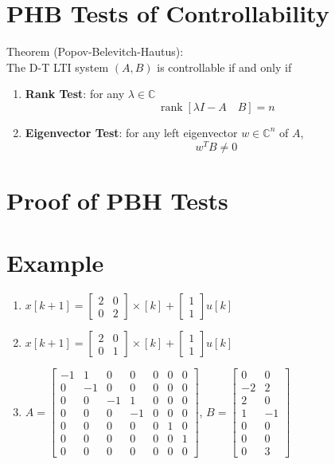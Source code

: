 \documentclass[10pt,a4paper,oneside]{article}
\begin{document}
\section{PHB Tests of Controllability}
Theorem (Popov-Belevitch-Hautus):\\
The D-T LTI system $(A, B)$ is controllable if and only if
\begin{enumerate}
\item {\bfseries Rank Test}: for any $\lambda\in\mathbb{C}$
\[
\operatorname{rank}[\lambda I-A \quad B]=n
\]
\item {\bfseries Eigenvector Test}: for any left eigenvector $w\in\mathbb{C}^n$ of $A$,
\[
w^{T} B \neq 0
\]
\end{enumerate}
\section{Proof of PBH Tests}
\section{Example}
\begin{enumerate}
\item $x[k+1]=\left[\begin{array}{ll}{2} & {0} \\ {0} & {2}\end{array}\right] \times[k]+\left[\begin{array}{l}{1} \\ {1}\end{array}\right] u[k]$
\item $x[k+1]=\left[\begin{array}{ll}{2} & {0} \\ {0} & {1}\end{array}\right] \times[k]+\left[\begin{array}{l}{1} \\ {1}\end{array}\right] u[k]$
\item $A = \left[\begin{array}{ccccccc}{-1} & {1} & {0} & {0} & {0} & {0} & {0} \\ {0} & {-1} & 0 & {0} & {0} & {0} & {0} \\ {0} & {0} & {-1} & {1} & {0} & {0} & {0} \\ {0} & {0} & {0} & {-1} & {0} & {0} & {0} \\ {0} & {0} & {0} & {0} & {0} & {1} & {0} \\ {0} & {0} & {0} & {0} & {0} & {0} & {1} \\ {0} & {0} & {0} & {0} & {0} & {0} & {0}\end{array}\right]$, $B = \left[\begin{array}{cc}0&0\\-2&2\\2&0\\1&-1\\0&0\\0&0\\0&3\end{array}\right]$
\end{enumerate}
\end{document}
